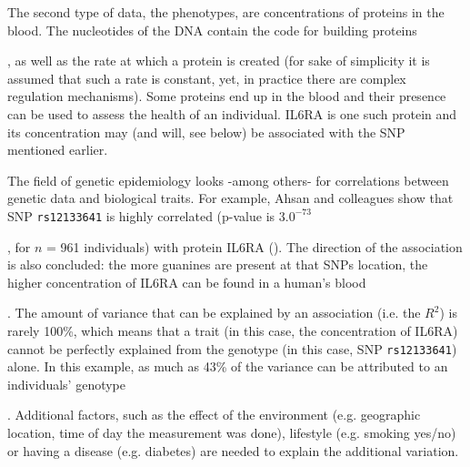 The second type of data, the phenotypes, 
are concentrations of proteins in the blood. 
The nucleotides of the DNA contain the code for building proteins

,
as well as the rate at which a protein is created (for 
sake of simplicity it is assumed that such a rate is constant,
yet, in practice there are complex regulation mechanisms).
Some proteins end up in the blood and
their presence can be used to assess the health of an individual.
IL6RA is one such protein and its concentration may (and will, see below)
be associated with the SNP mentioned earlier.

The field of genetic epidemiology looks -among others- for
correlations between genetic data and biological traits.
For example, Ahsan and colleagues show that
SNP \verb|rs12133641| is highly correlated (p-value is $3.0^{-73}$

,
for $n$ = 961 individuals) with protein IL6RA (\cite{ahsan2017relative}).
The direction of the association is also concluded:
the more guanines are present at that SNPs location,
the higher concentration of IL6RA can be found in a human's blood

. The amount of variance that can be explained by an association (i.e.
the \begin{math}R^2\end{math}) is rarely 100\%, which means that a trait (in
this case, the concentration of IL6RA) cannot be perfectly explained
from the genotype (in this case, SNP \verb|rs12133641|) alone. 
In this example, as much as 43\% of the variance 
can be attributed to an individuals' genotype

. Additional factors, 
such as the effect
of the environment (e.g. geographic location, time of day the measurement 
was done), lifestyle (e.g. smoking yes/no) or having a disease (e.g. diabetes) 
are needed to explain the additional variation.

